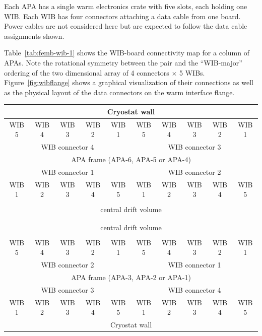 \documentclass[pdftex,12pt,letter]{article}
\begin{document}
Each APA has a single warm electronics crate with five slots, each
holding one WIB.  Each WIB has four connectors attaching a data cable
from one board.  Power cables are not considered here but are expected
to follow the data cable assignments shown.

Table~\ref{tab:femb-wib-1} shows the WIB-board connectivity map for a
column of APAs.  Note the rotational symmetry between the pair and the
``WIB-major'' ordering of the two dimensional array of 4 connectors
$\times$ 5 WIBs.  Figure~\ref{fig:wibflange} shows a graphical
visualization of their connections as well as the physical layout of
the data connectors on the warm interface flange.

\begin{table}[htp]
  \centering
  \begin{tabular}[h]{|c|c|c|c|c|c|c|c|c|c|}
    \hline
    \multicolumn{10}{|c|}{Cryostat wall} \\
    \hline
    WIB 5 & WIB 4 & WIB 3 & WIB 2 & WIB 1 & WIB 5 & WIB 4 & WIB 3 & WIB 2 & WIB 1 \\
    \multicolumn{5}{|c|}{WIB connector 4} & \multicolumn{5}{c|}{WIB connector 3} \\
    \hline
    \multicolumn{10}{|c|}{APA frame (APA-6, APA-5 or APA-4)} \\
    \hline
    \multicolumn{5}{|c|}{WIB connector 1} & \multicolumn{5}{c|}{WIB connector 2} \\
    WIB 1 & WIB 2 & WIB 3 & WIB 4 & WIB 5 & WIB 1 & WIB 2 & WIB 3 & WIB 4 & WIB 5\\
    \hline
    \multicolumn{10}{|c|}{} \\
    \multicolumn{10}{|c|}{central drift volume} \\
    \multicolumn{10}{|c|}{} \\
    \hline
    \hline
    \hline
    \multicolumn{10}{|c|}{} \\
    \multicolumn{10}{|c|}{central drift volume} \\
    \multicolumn{10}{|c|}{} \\
    \hline
    WIB 5 & WIB 4 & WIB 3 & WIB 2 & WIB 1 & WIB 5 & WIB 4 & WIB 3 & WIB 2 & WIB 1\\
    \multicolumn{5}{|c|}{WIB connector 2} & \multicolumn{5}{c|}{WIB connector 1} \\
    \hline
    \multicolumn{10}{|c|}{APA frame (APA-3, APA-2 or APA-1)} \\
    \hline
    \multicolumn{5}{|c|}{WIB connector 3} & \multicolumn{5}{c|}{WIB connector 4} \\
    WIB 1 & WIB 2 & WIB 3 & WIB 4 & WIB 5 & WIB 1 & WIB 2 & WIB 3 & WIB 4 & WIB 5\\
    \hline
    \multicolumn{10}{|c|}{Cryostat wall} \\
    \hline



\end{tabular}
\end{table}
\end{document}

